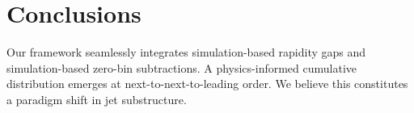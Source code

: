 \section{Conclusions}\label{sec:conclusions}

Our framework seamlessly integrates simulation-based rapidity gaps and
simulation-based zero-bin subtractions. A physics-informed cumulative
distribution emerges at next-to-next-to-leading order. We believe this
constitutes a paradigm shift in jet substructure.

